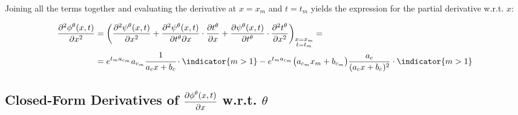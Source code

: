 Joining all the terms together and evaluating the derivative at $x = x_m$ and $t = t_m$ yields the expression for the partial derivative w.r.t. $x$:

\begin{equation}\label{eq:derivative_x2_complete}
\begin{aligned}
  \frac{\partial^2 \phi^\theta(x,t)}{\partial x^2} &= 
  \bigg(
  \frac{\partial^2 \psi^\theta(x,t)}{\partial x^2} + 
  \frac{\partial^2 \psi^\theta(x,t)}{\partial t^\theta \partial x} \cdot
  \frac{\partial t^\theta}{\partial x} + 
  \frac{\partial \psi^\theta(x,t)}{\partial t^\theta} \cdot
  \frac{\partial^2 t^\theta}{\partial x^2}
  \bigg)_{\substack{x = x_m \\ t = t_m}} = \\ &=
  e^{t_m a_{c_m}} a_{c_m} \cfrac{1}{a_c x + b_c} \cdot \indicator{m>1} - %
  e^{t_m a_{c_m}} \big( a_{c_m} x_m + b_{c_m} \big) \frac{a_{c}}{(a_{c} x + b_{c})^2} \cdot \indicator{m>1} %
\end{aligned}
\end{equation}





\subsection{Closed-Form Derivatives of $\cfrac{\partial \phi^\theta(x,t)}{\partial x}$ w.r.t. $\theta$}\label{sec:closed_form_derivative_x_theta}

